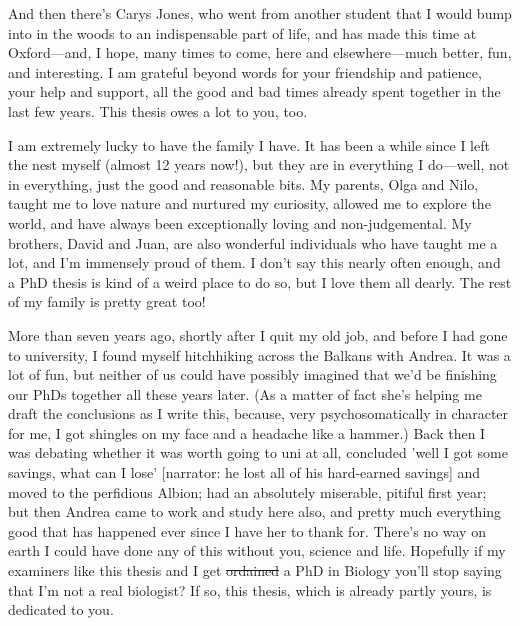 And then there's Carys Jones, who went from another student that I would bump into in the woods to an indispensable part of life, and has made this time at Oxford---and, I hope, many times to come, here and elsewhere---much better, fun, and interesting. I am grateful beyond words for your friendship and patience, your help and support, all the good and bad times already spent together in the last few years. This thesis owes a lot to you, too.

I am extremely lucky to have the family I have. It has been a while since I left the nest myself (almost 12 years now!), but they are in everything I do---well, not in everything, just the good and reasonable bits. My parents, Olga and Nilo, taught me to love nature and nurtured my curiosity, allowed me to explore the world, and have always been exceptionally loving and non-judgemental. My brothers, David and Juan, are also wonderful individuals who have taught me a lot, and I'm immensely proud of them. I don't say this nearly often enough, and a PhD thesis is kind of a weird place to do so, but I love them all dearly. The rest of my family is pretty great too!

More than seven years ago, shortly after I quit my old job, and before I had gone to university, I found myself hitchhiking across the Balkans with Andrea. It was a lot of fun, but neither of us could have possibly imagined that we'd be finishing our PhDs together all these years later. (As a matter of fact she's helping me draft the conclusions as I write this, because, very psychosomatically in character for me, I got shingles on my face and a headache like a hammer.) Back then I was debating whether it was worth going to uni at all, concluded 'well I got some savings, what can I lose' [narrator: he lost all of his hard-earned savings] and moved to the perfidious Albion; had an absolutely miserable, pitiful first year; but then Andrea came to work and study here also, and pretty much everything good that has happened ever since I have her to thank for. There's no way on earth I could have done any of this without you, science and life. Hopefully if my examiners like this thesis and I get \sout{ordained} a PhD in Biology you'll stop saying that I'm not a real biologist? If so, this thesis, which is already partly yours, is dedicated to you.
